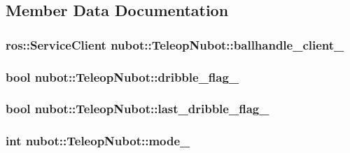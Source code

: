 \subsection{Member Data Documentation}
\hypertarget{classnubot_1_1TeleopNubot_aa2e697fc90b7891b53a8def6d0fb6348}{
\subsubsection[{ballhandle\-\_\-client\-\_\-}]{\setlength{\rightskip}{0pt plus 5cm}ros\-::\-Service\-Client nubot\-::\-Teleop\-Nubot\-::ballhandle\-\_\-client\-\_\-}}\label{classnubot_1_1TeleopNubot_aa2e697fc90b7891b53a8def6d0fb6348}
\hypertarget{classnubot_1_1TeleopNubot_a12765e31d28a4d422b7ffe335add42e4}{
\subsubsection[{dribble\-\_\-flag\-\_\-}]{\setlength{\rightskip}{0pt plus 5cm}bool nubot\-::\-Teleop\-Nubot\-::dribble\-\_\-flag\-\_\-\hspace{0.3cm}{\ttfamily [private]}}}\label{classnubot_1_1TeleopNubot_a12765e31d28a4d422b7ffe335add42e4}
\hypertarget{classnubot_1_1TeleopNubot_a15404d1259b5ef1e693b402fc684e729}{
\subsubsection[{last\-\_\-dribble\-\_\-flag\-\_\-}]{\setlength{\rightskip}{0pt plus 5cm}bool nubot\-::\-Teleop\-Nubot\-::last\-\_\-dribble\-\_\-flag\-\_\-\hspace{0.3cm}{\ttfamily [private]}}}\label{classnubot_1_1TeleopNubot_a15404d1259b5ef1e693b402fc684e729}
\hypertarget{classnubot_1_1TeleopNubot_a5ac3c220312010fd4003fe8ea7fc7fb9}{
\subsubsection[{mode\-\_\-}]{\setlength{\rightskip}{0pt plus 5cm}int nubot\-::\-Teleop\-Nubot\-::mode\-\_\-\hspace{0.3cm}{\ttfamily [private]}}}\label{classnubot_1_1TeleopNubot_a5ac3c220312010fd4003fe8ea7fc7fb9}

